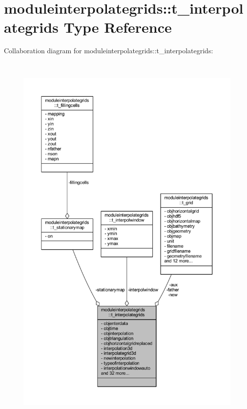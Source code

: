 \hypertarget{structmoduleinterpolategrids_1_1t__interpolategrids}{}\section{moduleinterpolategrids\+:\+:t\+\_\+interpolategrids Type Reference}
\label{structmoduleinterpolategrids_1_1t__interpolategrids}


Collaboration diagram for moduleinterpolategrids\+:\+:t\+\_\+interpolategrids\+:\nopagebreak
\begin{figure}[H]
\begin{center}
\leavevmode
\includegraphics[height=550pt]{structmoduleinterpolategrids_1_1t__interpolategrids__coll__graph}
\end{center}
\end{figure}

